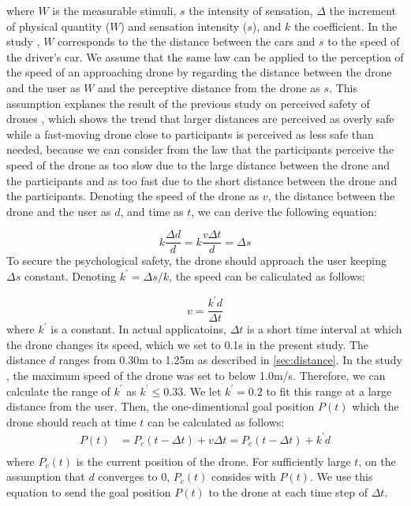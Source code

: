 where $W$ is the measurable stimuli, $s$ the intensity of sensation, $\Delta$ the increment of physical quantity ($W$) and sensation intensity ($s$), and $k$ the coefficient. 
In the study \cite{Kolling2012weber-fechner-law}, $W$ corresponds to the the distance between the cars and $s$ to the speed of the driver's car.
We assume that the same law can be applied to the perception of the speed of an approaching drone by regarding the distance between the drone and the user as $W$ and the perceptive distance from the drone as $s$.
This assumption explanes the result of the previous study on perceived safety of drones \cite{van2023perceived-safety}, 
which shows the trend that larger distances are perceived as overly safe while a fast-moving drone close to participants is perceived as less safe than needed,
because we can consider from the law that the participants perceive the speed of the drone as too slow due to the large distance between the drone and the participants and as too fast due to the short distance between the drone and the participants.
Denoting the speed of the drone as $v$, the distance between the drone and the user as $d$, and time as $t$, we can derive the following equation:

\begin{equation}
    \label{eq:weber}
    k{\frac{\Delta d}{d}} = k{\frac{v\Delta t}{d}}=\Delta s
\end{equation}
To secure the psychological safety, the drone should approach the user keeping $\Delta s$ constant.
Denoting $k^\prime = {\Delta s/k}$, the speed can be caliculated as follows:

\begin{equation}
    v = {\frac{k^\prime d}{\Delta t}}
    \label{eq:speed}
\end{equation}
where $k^\prime$ is a constant.
In actual applicatoins, $\Delta t$ is a short time interval at which the drone changes its speed, 
which we set to 0.1s in the present study.
The distance $d$ ranges from 0.30m to 1.25m as described in \ref{sec:distance}.
In the study \cite{lieser2021evaluating-distances}, the maximum speed of the drone was set to below 1.0m/s.
Therefore, we can calculate the range of $k^\prime$ as $k^\prime \le 0.33$.  
We let $k^\prime = 0.2$ to fit this range at a large distance from the user.
Then, the one-dimentional goal position $P(t)$ which the drone should reach at time $t$ can be calculated as follows:
\begin{equation}
    \begin{aligned}    
        P(t) &= P_c(t-\Delta t) + v\Delta t = P_c(t-\Delta t) + k^\prime d\\
    \label{eq:goal}
    \end{aligned}
\end{equation}
where $P_c(t)$ is the current position of the drone.
For sufficiently large $t$, on the assumption that $d$ converges to 0, $P_c(t)$ consides with $P(t)$. 
We use this equation to send the goal position $P(t)$ to the drone at each time step of $\Delta t$.


